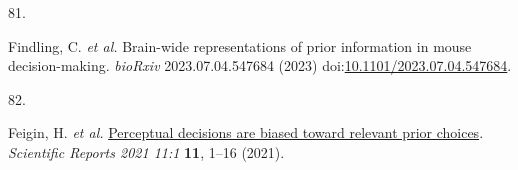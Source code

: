 \documentclass[
]{article}
\newlength{\cslhangindent}
\newlength{\csllabelwidth}
\newlength{\cslentryspacingunit} %
\newenvironment{CSLReferences}[2] %
 {%
  \setlength{\parindent}{0pt}
  \ifodd #1
  \let\oldpar\par
  \def\par{\hangindent=\cslhangindent\oldpar}
  \fi
  \setlength{\parskip}{#2\cslentryspacingunit}
 }%
 {}
\newcommand{\CSLLeftMargin}[1]{\parbox[t]{\csllabelwidth}{#1}}
\newcommand{\CSLRightInline}[1]{\parbox[t]{\linewidth - \csllabelwidth}{#1}\break}
\begin{document}
\begin{CSLReferences}{0}{0}
\leavevmode{}%
\CSLLeftMargin{81. }%
\CSLRightInline{Findling, C. \emph{et al.} Brain-wide representations of
prior information in mouse decision-making. \emph{bioRxiv}
2023.07.04.547684 (2023)
doi:\href{https://doi.org/10.1101/2023.07.04.547684}{10.1101/2023.07.04.547684}.}

\leavevmode{}%
\CSLLeftMargin{82. }%
\CSLRightInline{Feigin, H. \emph{et al.}
\href{https://doi.org/10.1038/s41598-020-80128-0}{Perceptual decisions
are biased toward relevant prior choices}. \emph{Scientific Reports 2021
11:1} \textbf{11}, 1--16 (2021).}

\end{CSLReferences}
\end{document}
